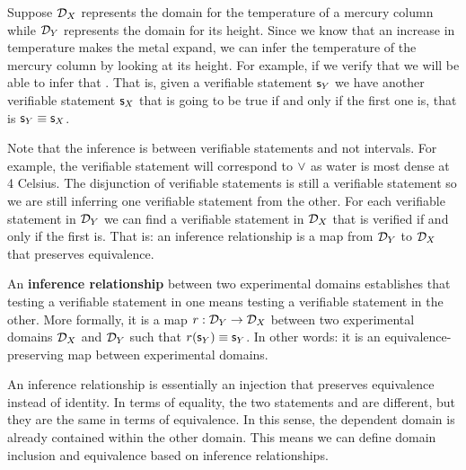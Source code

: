 \documentclass[11pt,letterpaper,fleqn]{memoir} %
\begin{document}
Suppose $\mathcal{D}_X$ represents the domain for the temperature of a mercury column while $\mathcal{D}_Y$ represents the domain for its height. Since we know that an increase in temperature makes the metal expand, we can infer the temperature of the mercury column by looking at its height. For example, if we verify that  we will be able to infer that . That is, given a verifiable statement $\mathsf{s}_Y$ we have another verifiable statement $\mathsf{s}_X$ that is going to be true if and only if the first one is, that is $\mathsf{s}_Y\equiv\mathsf{s}_X$.

Note that the inference is between verifiable statements and not intervals. For example, the verifiable statement  will correspond to $\vee$ as water is most dense at 4 Celsius. The disjunction of verifiable statements is still a verifiable statement so we are still inferring one verifiable statement from the other. For each verifiable statement in $\mathcal{D}_Y$ we can find a verifiable statement in $\mathcal{D}_X$ that is verified if and only if the first is. That is: an inference relationship is a map from $\mathcal{D}_Y$ to $\mathcal{D}_X$ that preserves equivalence.

\begin{mathSection}
	\begin{defn}
		An \textbf{inference relationship} between two experimental domains establishes that testing a verifiable statement in one means testing a verifiable statement in the other. More formally, it is a map $r: \mathcal{D}_Y \to \mathcal{D}_X$ between two experimental domains $\mathcal{D}_X$ and $\mathcal{D}_Y$ such that $r(\mathsf{s}_Y) \equiv \mathsf{s}_Y$. In other words: it is an equivalence-preserving map between experimental domains.
	\end{defn}
\end{mathSection}

An inference relationship is essentially an injection that preserves equivalence instead of identity. In terms of equality, the two statements  and  are different, but they are the same in terms of equivalence. In this sense, the dependent domain is already contained within the other domain. This means we can define domain inclusion and equivalence based on inference relationships.
\end{document}

